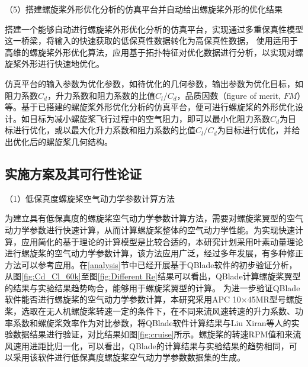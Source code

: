 （5）搭建螺旋桨外形优化分析的仿真平台并自动给出螺旋桨外形的优化结果

搭建一个能够自动进行螺旋桨外形优化分析的仿真平台，实现通过多重保真性模型这一桥梁，将输入的快速获取的低保真性数据转化为高保真性数据，
使用适用于高维的螺旋桨外形优化算法，应用基于拓扑特征对优化数据进行分析，以实现对螺旋桨外形进行快速地优化。

仿真平台的输入参数为优化参数，如待优化的几何参数，输出参数为优化目标，如阻力系数$C_d$，升力系数和阻力系数的比值$C_l/C_d$，品质因数（figure of merit, $FM$）等。基于已搭建的螺旋桨外形优化分析的仿真平台，便可进行螺旋桨的外形优化设计。如目标为减小螺旋桨飞行过程中的空气阻力，即可以最小化阻力系数$C_d$为目标进行优化，或以最大化升力系数和阻力系数的比值$C_l/C_d$为目标进行优化，并给出优化后的螺旋桨几何结构。


\vspace{0.8em}
\subsection{实施方案及其可行性论证}\label{plan}
\vspace{0.8em}

（1）低保真度螺旋桨空气动力学参数计算方法

为建立具有低保真度的螺旋桨空气动力学参数计算方法，需要对螺旋桨翼型的空气动力学参数进行快速计算，从而计算螺旋桨整体的空气动力学性能。为实现快速计算，应用简化的基于理论的计算模型是比较合适的，本研究计划采用叶素动量理论进行螺旋桨的空气动力学参数计算，该方法应用广泛，经过多年发展，有多种修正方法可以参考应用。在\ref{analysis}节中已经开展基于QBlade软件的初步验证分析，从图\ref{fig:Cd_Cl_60k}至图\ref{fig:Different Re}结果可以看出，QBlade计算螺旋桨翼型的结果与实验结果趋势吻合，能够用于螺旋桨翼型的计算。
为进一步验证QBlade软件能否进行螺旋桨的空气动力学参数计算，本研究采用APC 10×45MR型号螺旋桨，选取在无人机螺旋桨转速一定的条件下，在不同来流风速转速的升力系数、功率系数和螺旋桨效率作为对比参数，将QBlade软件计算结果与Liu Xiran等人\citep{Liu2023AST}的实验数据结果进行验证，对比结果如图\ref{fig:cruise}所示。螺旋桨的转速RPM值和来流风速用进距比归一化，可以看出，QBlade的计算结果与实验结果的趋势相同，可以采用该软件进行低保真度螺旋桨空气动力学参数数据集的生成。



